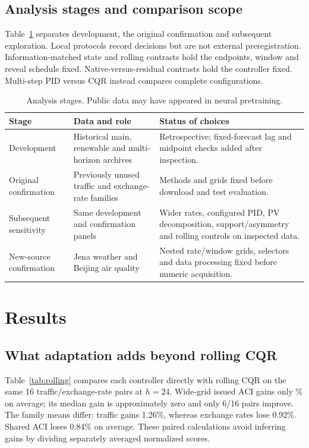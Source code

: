 \documentclass[preprint,11pt]{elsarticle}
\begin{document}
\subsection{Analysis stages and comparison scope}
Table~\ref{tab:phases} separates development, the original confirmation and subsequent
exploration. Local protocols record decisions but are not external preregistration.
Information-matched state and rolling contrasts hold the endpoints, window and
reveal schedule fixed. Native-versus-residual contrasts hold the controller fixed.
Multi-step PID versus CQR instead compares complete configurations.

\begin{table}[!htbp]\centering\small
\caption{Analysis stages. Public data may have appeared in neural pretraining.}
\label{tab:phases}
\begin{tabular}{p{}p{}p{}}\toprule
Stage & Data and role & Status of choices \\\midrule
Development & Historical main, renewable and multi-horizon archives & Retrospective;
fixed-forecast lag and midpoint checks added after inspection. \\
Original confirmation & Previously unused traffic and exchange-rate families &
Methods and grids fixed before download and test evaluation. \\
Subsequent sensitivity & Same development and confirmation panels & Wider rates,
configured PID, PV decomposition, support/asymmetry and rolling controls on inspected data. \\
New-source confirmation & Jena weather and Beijing air quality & Nested rate/window
grids, selectors and data processing fixed before numeric acquisition. \\\bottomrule
\end{tabular}\end{table}

\section{Results}


\subsection{What adaptation adds beyond rolling CQR}\label{sec:rolling}
Table~\ref{tab:rolling} compares each controller directly with rolling CQR on the
same 16 traffic/exchange-rate pairs at $h=24$. Wide-grid issued ACI gains only
\IssuedRollingGain\% on average; its median gain is approximately zero and only
6/16 pairs improve. The family means differ: traffic gains 1.26\%, whereas exchange
rates lose 0.92\%. Shared ACI loses 0.84\% on average. These paired calculations
avoid inferring gains by dividing separately averaged normalized scores.
\end{document}
